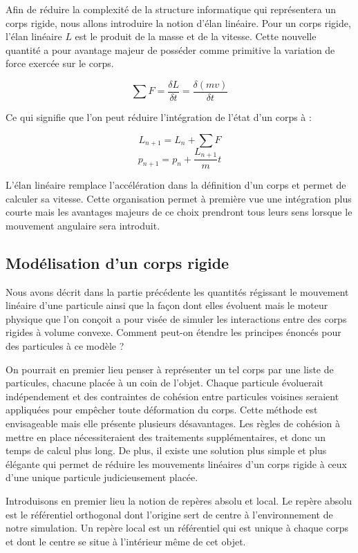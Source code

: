 Afin de réduire la complexité de la structure informatique qui représentera un corps rigide, nous allons introduire la notion d'élan linéaire. Pour un corps rigide, l'élan linéaire $L$ est le produit de la masse et de la vitesse. Cette nouvelle quantité a pour avantage majeur de posséder comme primitive la variation de force exercée sur le corps.

\[{\sum F} = \frac{\delta L}{\delta t} = \frac{\delta (mv)}{\delta t}\]

Ce qui signifie que l'on peut réduire l'intégration de l'état d'un corps à :

\[L_{n+1} = L_n + {\sum F}\]
\[p_{n+1} = p_n + \frac{L_{n+1}}{m} t\]

L'élan linéaire remplace l'accélération dans la définition d'un corps et permet de calculer sa vitesse. Cette organisation permet à première vue une intégration plus courte mais les avantages majeurs de ce choix prendront tous leurs sens lorsque le mouvement angulaire sera introduit.

\subsection{Modélisation d'un corps rigide}

Nous avons décrit dans la partie précédente les quantités régissant le mouvement linéaire d'une particule ainsi que la façon dont elles évoluent mais le moteur physique que l'on conçoit a pour visée de simuler les interactions entre des corps rigides à volume convexe. Comment peut-on étendre les principes énoncés pour des particules à ce modèle ?

On pourrait en premier lieu penser à représenter un tel corps par une liste de particules, chacune placée à un coin de l'objet. Chaque particule évoluerait indépendement et des contraintes de cohésion entre particules voisines seraient appliquées pour empêcher toute déformation du corps. Cette méthode est envisageable mais elle présente plusieurs désavantages. Les règles de cohésion à mettre en place nécessiteraient des traitements supplémentaires, et donc un temps de calcul plus long. De plus, il existe une solution plus simple et plus élégante qui permet de réduire les mouvements linéaires d'un corps rigide à ceux d'une unique particule judicieusement placée.

Introduisons en premier lieu la notion de repères absolu et local. Le repère absolu est le référentiel orthogonal dont l'origine sert de centre à l'environnement de notre simulation. Un repère local est un référentiel qui est unique à chaque corps et dont le centre se situe à l'intérieur même de cet objet.

